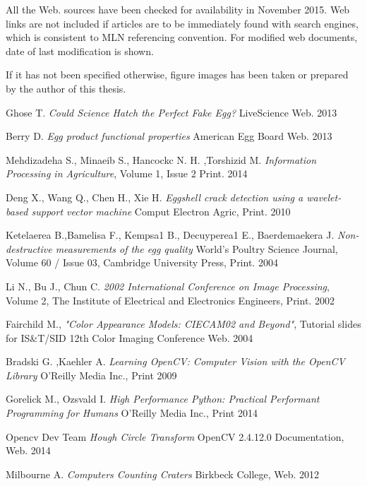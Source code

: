 \documentclass[12pt,twoside,a4paper]{article}
\begin{document}
All the Web. sources have been checked for availability in November 2015.
Web links are not included if articles are to be immediately found with search engines, which is consistent to MLN referencing convention.
For modified web documents, date of last modification is shown.

If it has not been specified otherwise, figure images has been taken or prepared by the author of this thesis.

\begin{thebibliography}{9}


Ghose T.
\textit{Could Science Hatch the Perfect Fake Egg?}  LiveScience Web. 2013
 
Berry D.
\textit{Egg product functional properties} 
American Egg Board Web. 2013

Mehdizadeha S., Minaeib S., Hancockc N. H. ,Torshizid M.
\textit{Information Processing in Agriculture}, Volume 1, Issue 2 
Print. 2014

Deng X., Wang Q., Chen H., Xie H.
\textit{Eggshell crack detection using a wavelet-based support vector machine} Comput Electron Agric, Print. 2010

Ketelaerea B.,Bamelisa F., Kempsa1 B., Decuyperea1 E., Baerdemaekera J.
\textit{Non-destructive measurements of the egg quality} World's Poultry Science Journal, Volume 60 / Issue 03,  Cambridge University Press, Print. 2004
 

Li N., Bu J., Chun C. 
\textit{2002 International Conference on Image Processing}, Volume 2, The Institute of Electrical and Electronics Engineers, Print. 2002

Fairchild M., 
\textit{"Color Appearance Models: CIECAM02 and Beyond"}, Tutorial slides for IS\&T/SID 12th Color Imaging Conference Web. 2004
 
Bradski G. ,Kaehler A.
\textit{Learning OpenCV: Computer Vision with the OpenCV Library} O'Reilly Media Inc., Print 2009


Gorelick M., Ozsvald I.
\textit{High Performance Python: Practical Performant Programming for Humans} O'Reilly Media Inc., Print 2014

Opencv Dev Team
\textit{Hough Circle Transform} OpenCV 2.4.12.0 Documentation, Web. 2014

Milbourne A.
\textit{Computers Counting Craters} Birkbeck College, Web. 2012


\end{thebibliography}
\end{document}
